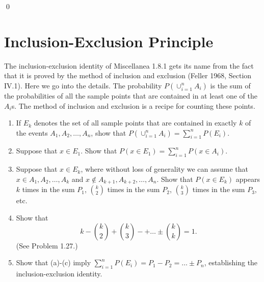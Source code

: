 \qed
\section{Inclusion-Exclusion Principle}

\begin{problembox}
The inclusion-exclusion identity of Miscellanea 1.8.1 gets its name from the fact that it is proved by the method of inclusion and exclusion (Feller 1968, Section IV.1). Here we go into the details. The probability $P(\cup_{i=1}^{n}A_{i})$ is the sum of the probabilities of all the sample points that are contained in at least one of the $A_{i}$s. The method of inclusion and exclusion is a recipe for counting these points.
\begin{enumerate}[label=(\alph*)]
    \item If $E_{k}$ denotes the set of all sample points that are contained in exactly $k$ of the events $A_{1},A_{2},\ldots,A_{n}$, show that $P(\cup_{i=1}^{n}A_{i})=\sum_{i=1}^{n}P(E_{i})$.
    \item Suppose that $x\in E_{1}$. Show that $P(x\in E_{1})=\sum_{i=1}^{n}P(x\in A_{i})$.
    \item Suppose that $x\in E_{k}$, where without loss of generality we can assume that $x\in A_{1},A_{2},\ldots,A_{k}$ and $x\notin A_{k+1},A_{k+2},\ldots,A_{n}$. Show that $P(x\in E_{k})$ appears $k$ times in the sum $P_{1}$, $\binom{k}{2}$ times in the sum $P_{2}$, $\binom{k}{3}$ times in the sum $P_{3}$, etc.
    \item Show that \[k-\binom{k}{2}+\binom{k}{3}-+\ldots\pm\binom{k}{k}=1.\] (See Problem 1.27.)
    \item Show that (a)-(c) imply $\sum_{i=1}^{n}P(E_{i})=P_{1}-P_{2}=\ldots\pm P_{n}$, establishing the inclusion-exclusion identity.
\end{enumerate}
\end{problembox}

